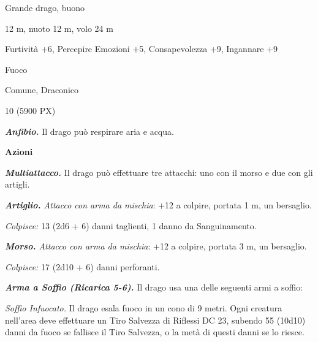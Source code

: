 \begin{multicols}{2}
{
\begin{description}[noitemsep, topsep=0pt, parsep=0pt, partopsep=0pt, itemsep=1pt, leftmargin=2.35cm,  labelwidth=2.2cm, itemindent=0cm, listparindent=0pt] %
\setlength{\baselineskip}{10pt}
\item[\textbf{Taglia/Tipo}] Grande drago, buono
\item[\textbf{Caratt.}] 
\item[\textbf{Punti Ferita}] 
\item[\textbf{Movimento}] 12 m, nuoto 12 m, volo 24 m
\item[\textbf{Tiri Salvez.}] 
\item[\textbf{Comp.}] Furtività +6, Percepire Emozioni +5, Consapevolezza +9, Ingannare +9
\item[\textbf{Imm. Danni}] Fuoco
\item[\textbf{Sensi}] 
\item[\textbf{Linguaggi}] Comune, Draconico
\item[\textbf{Sfida}] 10 (5900 PX)
\end{description}
\smallskip

\emph{\textbf{Anfibio.}} Il drago può respirare aria e acqua.

\textbf{Azioni}

\emph{\textbf{Multiattacco.}} Il drago può effettuare tre attacchi: uno con il morso e due con gli artigli.

\emph{\textbf{Artiglio.} Attacco con arma da mischia}: +12 a colpire, portata 1 m, un bersaglio.

\emph{Colpisce:} 13 (2d6 + 6) danni taglienti, 1 danno da Sanguinamento.

\emph{\textbf{Morso.} Attacco con arma da mischia}: +12 a colpire, portata 3 m, un bersaglio.

\emph{Colpisce:} 17 (2d10 + 6) danni perforanti.

\emph{\textbf{Arma a Soffio (Ricarica 5-6).}} Il drago usa una delle seguenti armi a soffio:

\emph{Soffio Infuocato.} Il drago esala fuoco in un cono di 9 metri. Ogni creatura nell'area deve effettuare un Tiro Salvezza di Riflessi DC 23, subendo 55 (10d10) danni da fuoco se fallisce il Tiro Salvezza, o la metà di questi danni se lo riesce.

}
\end{multicols}
